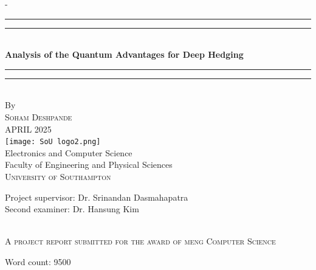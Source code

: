 \documentclass[12pt]{article}
\numberwithin{equation}{section}
\begin{document}
\begin{titlepage}
\begin{adjustwidth*}{}{-\unitlength}
\vspace*{3mm}
\begin{center}
\rule[0.5ex]{\linewidth}{2pt}\vspace*{-\baselineskip}\vspace*{3.2pt}
\rule[0.5ex]{\linewidth}{1pt}\\[\baselineskip]
{
\doublespacing
\fontsize{20}{24}\selectfont
\textbf{Analysis of the Quantum Advantages for Deep Hedging}\\[4mm]
}
\rule[0.5ex]{\linewidth}{1pt}\vspace*{-\baselineskip}\vspace{3.2pt}
\rule[0.5ex]{\linewidth}{2pt}\\
\vspace{4mm}
{\large By}\\
\vspace{4mm}
{\large\textsc{Soham Deshpande}}\\
\vspace{4mm}
{\large\textsc{APRIL 2025}}\\  %
\vspace{9mm}
\texttt{[image: SoU logo2.png]}\\  
\vspace{4mm}
{\large Electronics and Computer Science\\
Faculty of Engineering and Physical Sciences\\
\textsc{University of Southampton}}\\
\vspace{9mm}
\begin{minipage}{9cm}
\centering
Project supervisor: Dr. Srinandan Dasmahapatra \\
Second examiner: Dr. Hansung Kim 
\end{minipage}\\
\vspace{8mm}
{\large\textsc{A project report submitted for the award of meng Computer Science}}
\vspace{5mm}
\end{center}
\begin{flushright}
{\small Word count: 9500} 
\end{flushright}
\end{adjustwidth*}
\end{titlepage}
\end{document}
